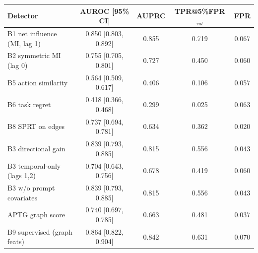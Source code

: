 \begin{tabular}{lcccc}
\toprule
Detector & AUROC [95\% CI] & AUPRC & TPR@5\%FPR$_{val}$ & FPR \\
\midrule
B1 net influence (MI, lag 1) & 0.850 [0.803, 0.892] & 0.855 & 0.719 & 0.067 \\
B2 symmetric MI (lag 0) & 0.755 [0.705, 0.801] & 0.727 & 0.450 & 0.060 \\
B5 action similarity & 0.564 [0.509, 0.617] & 0.406 & 0.106 & 0.057 \\
B6 task regret & 0.418 [0.366, 0.468] & 0.299 & 0.025 & 0.063 \\
B8 SPRT on edges & 0.737 [0.694, 0.781] & 0.634 & 0.362 & 0.020 \\
\midrule
B3 directional gain & 0.839 [0.793, 0.885] & 0.815 & 0.556 & 0.043 \\
B3 temporal-only (lags 1,2) & 0.704 [0.643, 0.756] & 0.678 & 0.419 & 0.060 \\
B3 w/o prompt covariates & 0.839 [0.793, 0.885] & 0.815 & 0.556 & 0.043 \\
APTG graph score & 0.740 [0.697, 0.785] & 0.663 & 0.481 & 0.037 \\
B9 supervised (graph feats) & 0.864 [0.822, 0.904] & 0.842 & 0.631 & 0.070 \\
\bottomrule
\end{tabular}